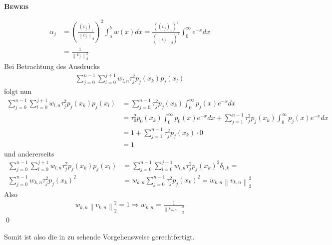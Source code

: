 \documentclass[12pt,a4paper]{scrartcl}
\numberwithin{equation}{section}
\numberwithin{myalgctr}{section}
\numberwithin{mytheoremctr}{subsection}
\numberwithin{mykorollarctr}{subsection}
\numberwithin{mylemmactr}{subsection}
\numberwithin{mybeispielctr}{subsection}
\newenvironment{myproof}{%
	\bigskip\noindent%
	\textsc{\textbf{\\Beweis\\}}%
	\indent
}{\qed\par\bigskip}  %
\newcommand\norm[1]{\left\lVert#1\right\rVert}
\begin{document}
\begin{myproof}
		\begin{align*}
			\alpha_j &= \left(\frac{(v_j)_1}{\norm{v_j}_2}\right)^2 \int_{a}^{b} w(x)dx = \frac{((v_j)_1)^2}{(\norm{v_j}_2)^2} \int_{0}^{\infty} e^{-x}dx \\
			& = \frac{1}{\norm{v_j}_2^2}
		\end{align*}
		Bei Betrachtung des Ausdrucks 
		\begin{align*}
			\sum_{j=0}^{n-1} \sum_{l=0}^{j+1} w_{l,n} \tau_j^2 p_j(x_k)p_j(x_l)
		\end{align*}
		folgt nun
		\begin{align*}
			\sum_{j=0}^{n-1} \sum_{l=0}^{j+1} w_{l,n} \tau_j^2 p_j(x_k)p_j(x_l) &= \sum_{j=0}^{n-1} \tau_j^2 p_j(x_k) \int_{0}^{\infty} p_j(x)e^{-x}dx \\
			& = \tau_0^2 p_0(x_k) \int_{0}^{\infty} p_0(x)e^{-x}dx + \sum_{j=1}^{n-1} \tau_j^2 p_j(x_k) \int_{0}^{\infty} p_j(x)e^{-x}dx \\
			& = 1 + \sum_{j=1}^{n-1} \tau_j^2 p_j(x_k) \cdot 0 \\
			& = 1
		\end{align*}
		und andererseits
		\begin{align*}
			\sum_{j=0}^{n-1} \sum_{l=0}^{j+1} w_{l,n} \tau_j^2 p_j(x_k)p_j(x_l) 
			 &= \sum_{j=0}^{n-1} \sum_{l=0}^{j+1} w_{l,n} \tau_j^2 p_j(x_k)^2 \delta_{l,k}= \\
			 \sum_{j=0}^{n-1} w_{k,n} \tau_j^2 p_j(x_k)^2 
			 &= w_{k,n} \sum_{j=0}^{n-1}  \tau_j^2 p_j(x_k)^2 
			 = w_{k,n}\norm{v_{k,n}}_2^2	
		\end{align*}
		Also
		\begin{align*}
			w_{k,n}\norm{v_{k,n}}_2^2 = 1 \Rightarrow  w_{k,n} = \frac{1}{\norm{v_{k,n}}_2^2}
		\end{align*}
	\end{myproof}
	\newpage
	Somit ist also die in  zu sehende Vorgehensweise gerechtfertigt.
	
	
	
\end{document}
